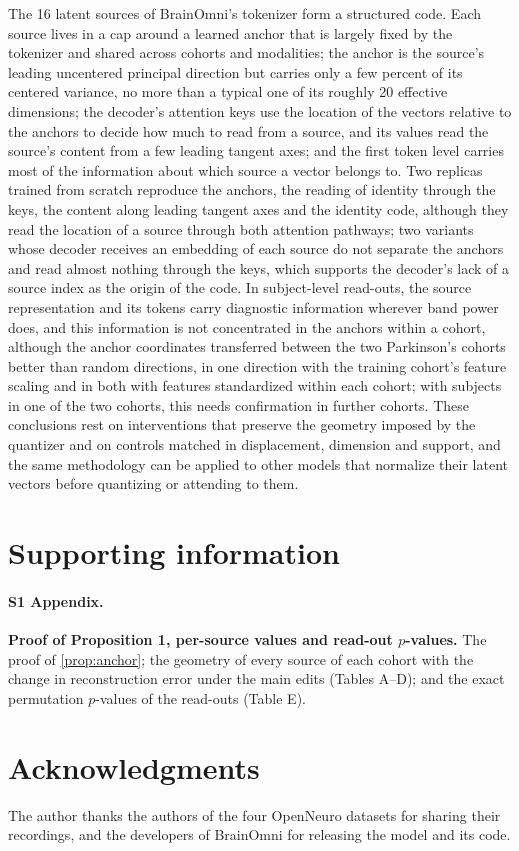 \documentclass[10pt,letterpaper]{article}
\begin{document}
The 16 latent sources of BrainOmni's tokenizer form a structured code. Each source lives in a
cap around a learned anchor that is largely fixed by the tokenizer and shared across cohorts and
modalities; the anchor is the source's leading uncentered principal direction but carries only a
few percent of its centered variance, no more than a typical one of its roughly 20 effective
dimensions; the decoder's attention keys use the location of the vectors relative to the anchors
to decide how much to read from a source, and its values read the source's content from a few
leading tangent axes; and the first token level carries most of the information about which
source a vector belongs to. Two replicas trained from scratch reproduce the anchors, the reading of
identity through the keys, the content along leading tangent axes and the identity code, although they
read the location of a source through both attention pathways; two variants whose decoder receives an
embedding of each source do not separate the anchors and read almost nothing through the keys, which
supports the
decoder's lack of a source index as the origin of the code.
In subject-level read-outs, the source representation and its tokens carry diagnostic
information wherever band power does, and this information is not concentrated in the anchors
within a cohort, although the anchor coordinates transferred between the two Parkinson's cohorts
better than random directions, in one direction with the training cohort's feature scaling and in both
with features standardized within each cohort; with \NUCSDPD{} subjects in one of the two cohorts, this
needs confirmation in further cohorts. These conclusions rest on interventions that preserve the geometry
imposed by the quantizer and on controls matched in displacement, dimension and support, and
the same methodology can be applied to other models that normalize their latent vectors before
quantizing or attending to them.

\section*{Supporting information}

\paragraph*{S1 Appendix.}
\label{S1_Appendix}
{\bf Proof of Proposition 1, per-source values and read-out $p$-values.} The proof of \cref{prop:anchor};
the geometry of every source of each cohort with the change in reconstruction error under the main edits
(Tables A--D); and the exact permutation $p$-values of the read-outs (Table E).

\section*{Acknowledgments}
The author thanks the authors of the four OpenNeuro datasets for sharing their recordings, and the
developers of BrainOmni for releasing the model and its code.

\nolinenumbers


\end{document}
